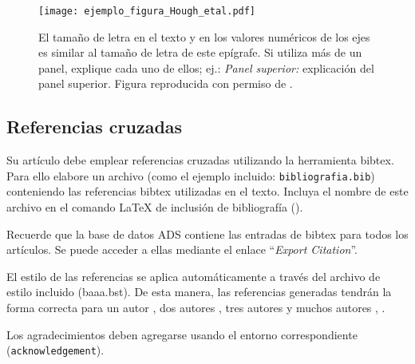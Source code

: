 \documentclass[baaa]{baaa}
\begin{document}

\begin{figure}[!t]
\centering
\texttt{[image: ejemplo\_figura\_Hough\_etal.pdf]}
\caption{El tamaño de letra en el texto y en los valores numéricos de los ejes es similar al tamaño de letra de este epígrafe. Si utiliza más de un panel, explique cada uno de ellos; ej.: \emph{Panel superior:} explicación del panel superior. Figura reproducida con permiso de \cite{Hough_etal_BAAA_2020}.}
\label{Figura}
\end{figure}

\subsection{Referencias cruzadas}\label{ref}

Su artículo debe emplear referencias cruzadas utilizando la herramienta  {\sc bibtex}. Para ello elabore un archivo (como el ejemplo incluido: {\tt bibliografia.bib}) conteniendo las referencias {\sc bibtex} utilizadas en el texto. Incluya el nombre de este archivo en el comando \LaTeX{} de inclusión de bibliografía (\verb||). 

Recuerde que la base de datos ADS contiene las entradas de {\sc bibtex}  para todos los artículos. Se puede acceder a ellas mediante el enlace ``{\em Export Citation}''.

El estilo de las referencias se aplica automáticamente a través del archivo de estilo incluido (baaa.bst). De esta manera, las referencias generadas tendrán la forma co\-rrec\-ta para un autor \citep{hubble_expansion_1929}, dos autores \citep{penzias_cmb_1965,penzias_cmb_II_1965}, tres autores \citep{navarro_NFW_1997} y muchos autores \citep{riess_SN1a_1998}, \citep{Planck_2016}.

\begin{acknowledgement}
Los agradecimientos deben agregarse usando el entorno correspondiente (\texttt{acknowledgement}).
\end{acknowledgement}
\end{document}
